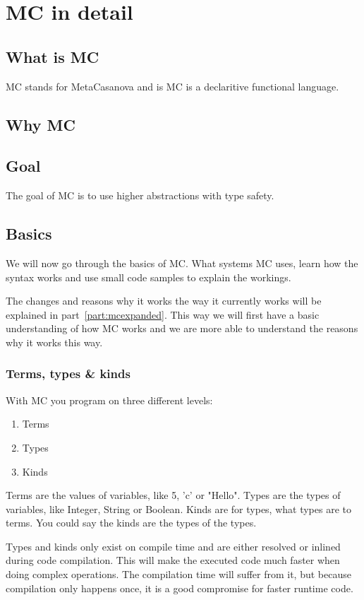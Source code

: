\chapter{MC in detail}

\section{What is MC}
MC stands for MetaCasanova and is MC is a declaritive functional language.
\section{Why MC}


\section{Goal}
The goal of MC is to use higher abstractions with type safety.

\section{Basics}
We will now go through the basics of MC.
What systems MC uses, learn how the syntax works and use small code samples to explain the workings.

The changes and reasons why it works the way it currently works will be explained in part~\ref{part:mcexpanded}.
This way we will first have a basic understanding of how MC works and we are more able to understand the reasons why it works this way.

\subsection{Terms, types \& kinds}\label{sec:basiclevels}
With MC you program on three different levels:
\begin{enumerate}[noitemsep]
   \item Terms
   \item Types
   \item Kinds
\end{enumerate}
Terms are the values of variables, like 5, 'c' or "Hello".
Types are the types of variables, like Integer, String or Boolean.
Kinds are for types, what types are to terms.
You could say the kinds are the types of the types.

Types and kinds only exist on compile time and are either resolved or inlined during code compilation.
This will make the executed code much faster when doing complex operations.
The compilation time will suffer from it, but because compilation only happens once, it is a good compromise for faster runtime code.

